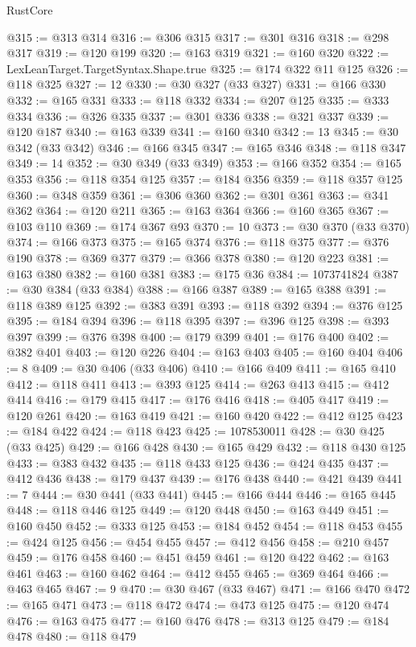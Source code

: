 \begin{lexlean}{RustCore}
\begin{coremodule}
@315 := @313 @314
@316 := @306 @315
@317 := @301 @316
@318 := @298 @317
@319 := @120 @199
@320 := @163 @319
@321 := @160 @320
@322 := LexLeanTarget.TargetSyntax.Shape.true
@325 := @174 @322 @11 @125
@326 := @118 @325
@327 := 12
@330 := @30 @327 (@33 @327)
@331 := @166 @330
@332 := @165 @331
@333 := @118 @332
@334 := @207 @125
@335 := @333 @334
@336 := @326 @335
@337 := @301 @336
@338 := @321 @337
@339 := @120 @187
@340 := @163 @339
@341 := @160 @340
@342 := 13
@345 := @30 @342 (@33 @342)
@346 := @166 @345
@347 := @165 @346
@348 := @118 @347
@349 := 14
@352 := @30 @349 (@33 @349)
@353 := @166 @352
@354 := @165 @353
@356 := @118 @354 @125
@357 := @184 @356
@359 := @118 @357 @125
@360 := @348 @359
@361 := @306 @360
@362 := @301 @361
@363 := @341 @362
@364 := @120 @211
@365 := @163 @364
@366 := @160 @365
@367 := @103 @110
@369 := @174 @367 @93
@370 := 10
@373 := @30 @370 (@33 @370)
@374 := @166 @373
@375 := @165 @374
@376 := @118 @375
@377 := @376 @190
@378 := @369 @377
@379 := @366 @378
@380 := @120 @223
@381 := @163 @380
@382 := @160 @381
@383 := @175 @36
@384 := 1073741824
@387 := @30 @384 (@33 @384)
@388 := @166 @387
@389 := @165 @388
@391 := @118 @389 @125
@392 := @383 @391
@393 := @118 @392
@394 := @376 @125
@395 := @184 @394
@396 := @118 @395
@397 := @396 @125
@398 := @393 @397
@399 := @376 @398
@400 := @179 @399
@401 := @176 @400
@402 := @382 @401
@403 := @120 @226
@404 := @163 @403
@405 := @160 @404
@406 := 8
@409 := @30 @406 (@33 @406)
@410 := @166 @409
@411 := @165 @410
@412 := @118 @411
@413 := @393 @125
@414 := @263 @413
@415 := @412 @414
@416 := @179 @415
@417 := @176 @416
@418 := @405 @417
@419 := @120 @261
@420 := @163 @419
@421 := @160 @420
@422 := @412 @125
@423 := @184 @422
@424 := @118 @423
@425 := 1078530011
@428 := @30 @425 (@33 @425)
@429 := @166 @428
@430 := @165 @429
@432 := @118 @430 @125
@433 := @383 @432
@435 := @118 @433 @125
@436 := @424 @435
@437 := @412 @436
@438 := @179 @437
@439 := @176 @438
@440 := @421 @439
@441 := 7
@444 := @30 @441 (@33 @441)
@445 := @166 @444
@446 := @165 @445
@448 := @118 @446 @125
@449 := @120 @448
@450 := @163 @449
@451 := @160 @450
@452 := @333 @125
@453 := @184 @452
@454 := @118 @453
@455 := @424 @125
@456 := @454 @455
@457 := @412 @456
@458 := @210 @457
@459 := @176 @458
@460 := @451 @459
@461 := @120 @422
@462 := @163 @461
@463 := @160 @462
@464 := @412 @455
@465 := @369 @464
@466 := @463 @465
@467 := 9
@470 := @30 @467 (@33 @467)
@471 := @166 @470
@472 := @165 @471
@473 := @118 @472
@474 := @473 @125
@475 := @120 @474
@476 := @163 @475
@477 := @160 @476
@478 := @313 @125
@479 := @184 @478
@480 := @118 @479

\end{coremodule}
\end{lexlean}
